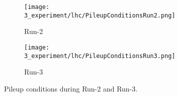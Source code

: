 \begin{figure}[ht!]
    \centering
    \begin{subfigure}[h]{0.49\linewidth}
        \centering
        \texttt{[image: 3\_experiment/lhc/PileupConditionsRun2.png]}
        \caption{Run-2}
        \label{fig:atlas:runs:pileup_run2}
    \end{subfigure}
    \hfill
    \begin{subfigure}[h]{0.49\linewidth}
        \centering
        \texttt{[image: 3\_experiment/lhc/PileupConditionsRun3.png]}
        \caption{Run-3}
        \label{fig:atlas:runs:pileup_run3}
    \end{subfigure}
    \caption{Pileup conditions during Run-2 and Run-3.}
    \label{fig:atlas:runs:pileup}
\end{figure}


































































